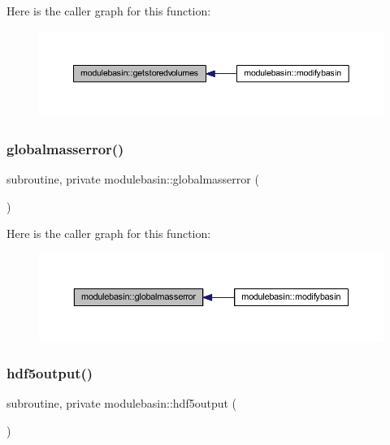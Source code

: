 Here is the caller graph for this function\+:\nopagebreak
\begin{figure}[H]
\begin{center}
\leavevmode
\includegraphics[width=350pt]{namespacemodulebasin_a51eb37f44f2fb4685ca3ed3454156732_icgraph}
\end{center}
\end{figure}
\mbox{\label{namespacemodulebasin_ac258b876198ebb36e6bb2b0fd0399158}} 
\subsubsection{\texorpdfstring{globalmasserror()}{globalmasserror()}}
{\footnotesize\ttfamily subroutine, private modulebasin\+::globalmasserror (\begin{DoxyParamCaption}{ }\end{DoxyParamCaption})\hspace{0.3cm}{\ttfamily [private]}}

Here is the caller graph for this function\+:\nopagebreak
\begin{figure}[H]
\begin{center}
\leavevmode
\includegraphics[width=350pt]{namespacemodulebasin_ac258b876198ebb36e6bb2b0fd0399158_icgraph}
\end{center}
\end{figure}
\mbox{\label{namespacemodulebasin_a728974f3cdc06d12227aa4b65b29b574}} 
\subsubsection{\texorpdfstring{hdf5output()}{hdf5output()}}
{\footnotesize\ttfamily subroutine, private modulebasin\+::hdf5output (\begin{DoxyParamCaption}{ }\end{DoxyParamCaption})\hspace{0.3cm}{\ttfamily [private]}}

